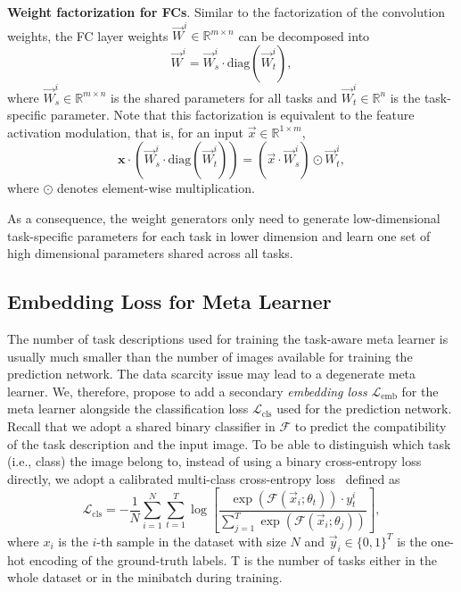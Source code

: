 \documentclass[10pt,twocolumn,letterpaper]{article}
\renewcommand{\vec}[1]{\mathbf{#1}}
\newcommand\minisection[1]{\vspace{2mm}\noindent \textbf{#1}}
\begin{document}
\minisection{Weight factorization for FCs}. 
Similar to the factorization of the convolution weights,
the FC layer weights $\Vec{W}^i\in\mathbb{R}^{m\times n}$ can be decomposed into 
\begin{equation}
\Vec{W}^i = \Vec{W}^i_s \cdot \text{diag}(\Vec{W}^i_t),
\end{equation}
where $ \Vec{W}^i_s\in\mathbb{R}^{m\times n}$ is the shared parameters for
all tasks and $\Vec{W}^i_t\in\mathbb{R}^{n}$ is the task-specific parameter. Note that this factorization 
is equivalent to the feature activation modulation, that is, for an input $\Vec{x}\in\mathbb{R}^{1\times m}$, 
\begin{equation}
\vec{x}\cdot(\Vec{W}^i_s \cdot \text{diag}(\Vec{W}^i_t))= (\Vec{x}\cdot\Vec{W}^i_s) \odot \Vec{W}^i_t,
\end{equation}
where $\odot$ denotes element-wise multiplication. 

As a consequence,  the weight generators only need to generate low-dimensional
task-specific parameters for each task in lower dimension and learn one set of high 
dimensional parameters shared across all tasks. 

\subsection{Embedding Loss for Meta Learner}
\label{sec:embed_loss}
The number of task descriptions used for training the
task-aware meta learner is usually much smaller than the number of images available
for training the prediction network. The data scarcity issue may lead to a 
degenerate meta learner. We, therefore, propose to add a secondary \textit{embedding
	loss} $\mathcal{L}_\text{emb}$ for the meta learner alongside the classification loss $\mathcal{L}_\text{cls}$ used for the prediction network. Recall that we adopt a shared binary classifier in $\mathcal{F}$ to predict the
compatibility of the task description and the input image. To be able to distinguish which task (i.e., class) 
the image belong to, instead of using a binary cross-entropy loss directly, we adopt a calibrated multi-class
cross-entropy loss~\cite{yang2018learning} defined as 
\begin{equation}
\mathcal{L}_\text{cls} = - \frac{1}{N}\sum_{i=1}^N\sum_{t=1}^T \log\left[\frac{\exp(\mathcal{F}(\Vec{x}_i;\theta_t))\cdot y^i_t}{\sum_{j=1}^T\exp(\mathcal{F}(\Vec{x}_i;\theta_j))} \right],
\end{equation}
where $x_i$ is the $i$-th sample in the dataset with size $N$ and $\Vec{y}_i\in\{0,1\}^T$ is the one-hot encoding of the ground-truth labels. T is the number of tasks either in the whole dataset or in the minibatch during 
training. 
\end{document}
